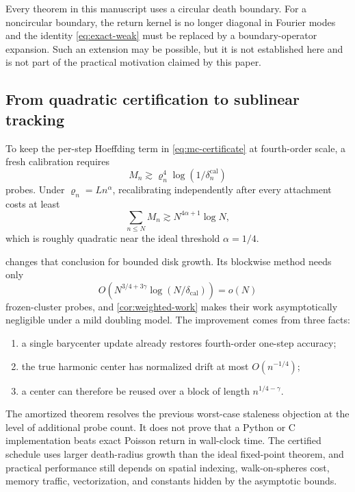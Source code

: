 \documentclass[11pt]{article}
\theoremstyle{mainthm}
\theoremstyle{definition}
\theoremstyle{remark}
\begin{document}
Every theorem in this manuscript uses a circular death boundary. For a noncircular boundary, the return kernel is no longer diagonal in Fourier modes and the identity \eqref{eq:exact-weak} must be replaced by a boundary-operator expansion. Such an extension may be possible, but it is not established here and is not part of the practical motivation claimed by this paper.

\subsection{From quadratic certification to sublinear tracking}

To keep the per-step Hoeffding term in \eqref{eq:mc-certificate} at fourth-order scale, a fresh calibration requires
\[
  M_n\gtrsim \varrho_n^4\log(1/\delta_n^{\mathrm{cal}})
\]
probes. Under $\varrho_n=Ln^\alpha$, recalibrating independently after every attachment costs at least
\[
  \sum_{n\le N}M_n\gtrsim N^{4\alpha+1}\log N,
\]
which is roughly quadratic near the ideal threshold $\alpha=1/4$.

 changes that conclusion for bounded disk growth. Its blockwise method needs only
\[
  O\!\left(N^{3/4+3\gamma}\log(N/\delta_{\mathrm{cal}})\right)=o(N)
\]
frozen-cluster probes, and \cref{cor:weighted-work} makes their work asymptotically negligible under a mild doubling model. The improvement comes from three facts:

\begin{enumerate}
  \item a single barycenter update already restores fourth-order one-step accuracy;
  \item the true harmonic center has normalized drift at most $O(n^{-1/4})$;
  \item a center can therefore be reused over a block of length $n^{1/4-\gamma}$.
\end{enumerate}

\begin{costbox}
The amortized theorem resolves the previous worst-case staleness objection at the level of additional probe count. It does not prove that a Python or C implementation beats exact Poisson return in wall-clock time. The certified schedule uses larger death-radius growth than the ideal fixed-point theorem, and practical performance still depends on spatial indexing, walk-on-spheres cost, memory traffic, vectorization, and constants hidden by the asymptotic bounds.
\end{costbox}
\end{document}
